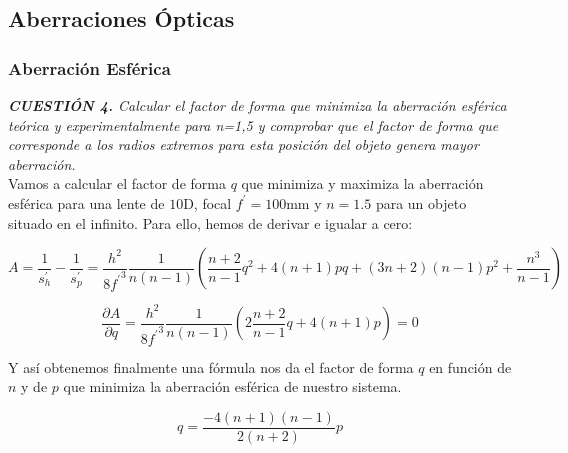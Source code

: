 \documentclass[11pt]{article}
\begin{document}
    \newpage

    \vspace{-0.5cm}\subsection{Aberraciones Ópticas}
        \subsubsection{Aberración Esférica}
            \textit{\textbf{CUESTIÓN 4.} Calcular el factor de forma que minimiza la aberración esférica teórica y experimentalmente para n=1,5 y comprobar que el factor de forma que corresponde a los radios extremos para esta posición del objeto genera mayor aberración.}\\

            Vamos a calcular el factor de forma $q$ que minimiza y maximiza la aberración esférica para una lente de $10$D, focal $f^\prime=100$mm y $n=1.5$ para un objeto situado en el infinito. Para ello, hemos de derivar e igualar a cero:

            \begin{equation}
                A = \dfrac{1}{s^\prime_h}-\dfrac{1}{s^\prime_p}=\dfrac{h^2}{8{f^\prime}^3}\dfrac{1}{n(n-1)}\left(\dfrac{n+2}{n-1}q^2+4(n+1)pq+(3n+2)(n-1)p^2+\dfrac{n^3}{n-1}\right)
                \label{eq:AberracionEsferica}
            \end{equation}

            \begin{equation}
                \dfrac{\partial A}{\partial q}=\dfrac{h^2}{8 {f^\prime}^3}\dfrac{1}{n(n-1)}\left(2\dfrac{n+2}{n-1}q+4(n+1)p\right)=0
                \label{eq:DerivadaAberracion}
            \end{equation}
            
            Y así obtenemos finalmente una fórmula nos da el factor de forma $q$ en función de $n$ y de $p$ que minimiza la aberración esférica de nuestro sistema.

            \begin{equation}
                q=\dfrac{-4(n+1)(n-1)}{2(n+2)}p
                \label{eq:AberracionEsfericaMinima}
            \end{equation}\\
\end{document}
